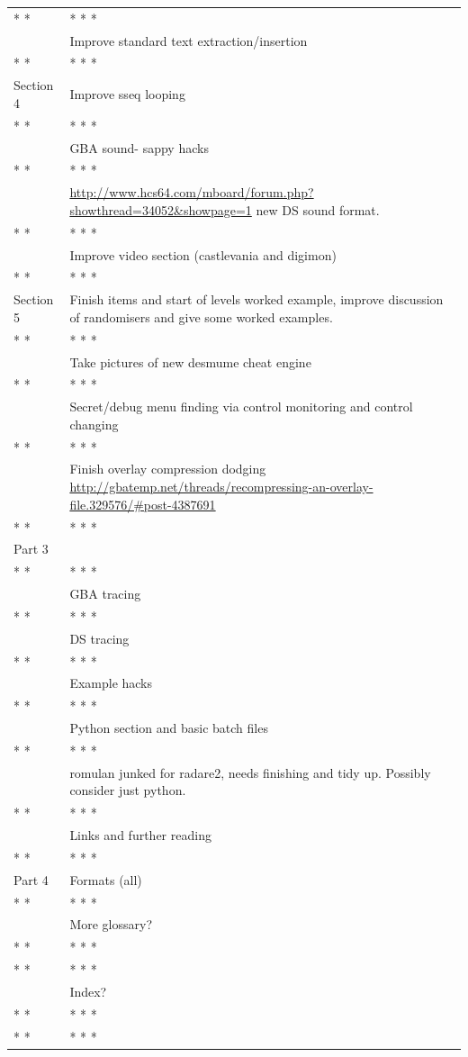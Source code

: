 \documentclass[
]{book}
\begin{document}
\begin{longtable}[]{@{}
  >{\raggedright\arraybackslash}p{}
  >{\raggedright\arraybackslash}p{}@{}}
* * * & * * * \\
& Improve standard text extraction/insertion \\
* * * & * * * \\
Section 4 & Improve sseq looping \\
* * * & * * * \\
& GBA sound- sappy hacks \\
* * * & * * * \\
& \url{http://www.hcs64.com/mboard/forum.php?showthread=34052\&showpage=1} new DS sound format. \\
* * * & * * * \\
& Improve video section (castlevania and digimon) \\
* * * & * * * \\
Section 5 & Finish items and start of levels worked example, improve discussion of randomisers and give some worked examples. \\
* * * & * * * \\
& Take pictures of new desmume cheat engine \\
* * * & * * * \\
& Secret/debug menu finding via control monitoring and control changing \\
* * * & * * * \\
& Finish overlay compression dodging \url{http://gbatemp.net/threads/recompressing-an-overlay-file.329576/\#post-4387691} \\
* * * & * * * \\
Part 3 & \\
* * * & * * * \\
& GBA tracing \\
* * * & * * * \\
& DS tracing \\
* * * & * * * \\
& Example hacks \\
* * * & * * * \\
& Python section and basic batch files \\
* * * & * * * \\
& romulan junked for radare2, needs finishing and tidy up. Possibly consider just python. \\
* * * & * * * \\
& Links and further reading \\
* * * & * * * \\
Part 4 & Formats (all) \\
* * * & * * * \\
& More glossary? \\
* * * & * * * \\
* * * & * * * \\
& Index? \\
* * * & * * * \\
* * * & * * * \\
\bottomrule()
\end{longtable}
\end{document}
